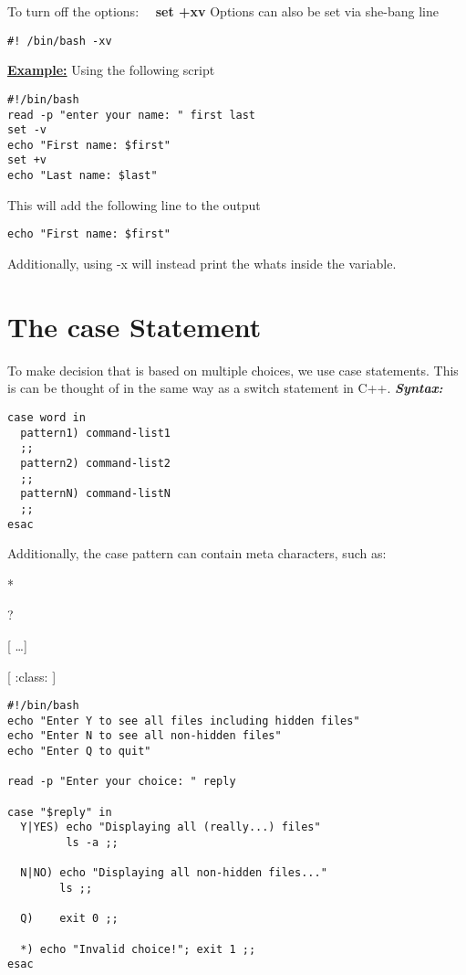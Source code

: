 \documentclass{report}
\begin{document}
To turn off the options: \ \ \textbf{set +xv}
\bigbreak \noindent
Options can also be set via she-bang line \vspace{1.5mm}
\begin{verbatim}
#! /bin/bash -xv
\end{verbatim}
\bigbreak \noindent
\textbf{\underline{Example:}} Using the following script
\begin{verbatim}
#!/bin/bash
read -p "enter your name: " first last
set -v
echo "First name: $first"
set +v
echo "Last name: $last"
\end{verbatim}
This will add the following line to the output
\begin{verbatim}
echo "First name: $first"
\end{verbatim}
Additionally, using -x will instead print the whats inside the variable.
\section{The case Statement}
To make decision that is based on multiple choices, we use case statements. This is can be thought of in the same way as a switch statement in C++.
\bigbreak \noindent
\textit{\textbf{Syntax:}}
\begin{verbatim}
case word in
  pattern1) command-list1
  ;;
  pattern2) command-list2
  ;;
  patternN) command-listN
  ;;
esac
\end{verbatim}
Additionally, the case pattern can contain meta characters, such as: \vspace{1.5mm}

* \vspace{1.5mm}

? \vspace{1.5mm}

[ \ldots ] \vspace{1.5mm}

[ :class: ]
\newpage
\begin{mdframed}
  \begin{verbatim}
#!/bin/bash
echo "Enter Y to see all files including hidden files"
echo "Enter N to see all non-hidden files"
echo "Enter Q to quit"

read -p "Enter your choice: " reply

case "$reply" in
  Y|YES) echo "Displaying all (really...) files"
         ls -a ;;

  N|NO) echo "Displaying all non-hidden files..."
        ls ;;

  Q)    exit 0 ;;

  *) echo "Invalid choice!"; exit 1 ;;
esac
\end{verbatim}
\end{mdframed}
\end{document}
